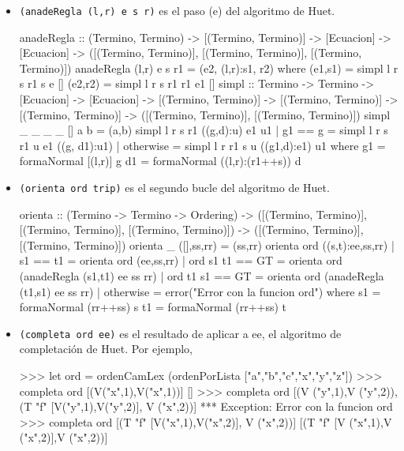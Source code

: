 \begin{itemize}
\item \texttt{(anadeRegla (l,r) e s r)}  es el paso
  (e) del algoritmo de Huet.

  \begin{codigo}
anadeRegla :: (Termino, Termino) -> [(Termino, Termino)]
              -> [Ecuacion] -> [Ecuacion]
              -> ([(Termino, Termino)], [(Termino, Termino)],
                 [(Termino, Termino)])
anadeRegla (l,r) e s r1 = (e2, (l,r):s1, r2)
    where (e1,s1) = simpl l r s r1 s e []
          (e2,r2) = simpl l r s r1 r1 e1 []
simpl
  :: Termino
     -> Termino
     -> [Ecuacion]
     -> [Ecuacion]
     -> [(Termino, Termino)]
     -> [(Termino, Termino)]
     -> [(Termino, Termino)]
     -> ([(Termino, Termino)], [(Termino, Termino)])
simpl _ _ _ _ [] a b = (a,b)
simpl l r s r1 ((g,d):u) e1 u1 
    | g1 == g =
        simpl l r s r1 u e1 ((g, d1):u1)
    | otherwise = simpl l r r1 s u ((g1,d):e1) u1
       where g1 = formaNormal [(l,r)] g
             d1 = formaNormal ((l,r):(r1++s)) d
\end{codigo}

\item \texttt{(orienta ord trip)}  es el segundo bucle
  del algoritmo de Huet.

  \begin{codigo}
orienta :: (Termino -> Termino -> Ordering)
           -> ([(Termino, Termino)],  [(Termino, Termino)],
               [(Termino, Termino)])
           -> ([(Termino, Termino)], [(Termino, Termino)])
orienta _ ([],ss,rr) = (ss,rr)
orienta ord ((s,t):ee,ss,rr)
    | s1 == t1 = orienta ord (ee,ss,rr)
    | ord s1 t1 == GT = orienta ord (anadeRegla (s1,t1)
                                              ee ss rr)
    | ord t1 s1 == GT = orienta ord (anadeRegla (t1,s1)
                                              ee ss rr)
    | otherwise = error("Error con la funcion ord")
    where s1 = formaNormal (rr++ss) s
          t1 = formaNormal (rr++ss) t
  \end{codigo}

\item \texttt{(completa ord ee)}  es el resultado de aplicar a ee, el algoritmo de completación de Huet. Por ejemplo,

  \begin{sesion}
>>> let ord = ordenCamLex (ordenPorLista ["a","b","c","x","y","z"])
>>> completa ord [(V("x",1),V("x",1))]
[]
>>> completa ord [(V ("y",1),V ("y",2)),
                  (T "f" [V("y",1),V("y",2)], V ("x",2))]
*** Exception: Error con la funcion ord
>>> completa ord [(T "f" [V("x",1),V("x",2)], V ("x",2))]
[(T "f" [V ("x",1),V ("x",2)],V ("x",2))]
\end{sesion}


\end{itemize}
